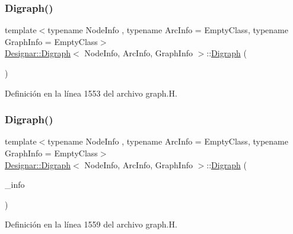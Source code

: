 \subsubsection{\texorpdfstring{Digraph()}{Digraph()}\hspace{0.1cm}{\footnotesize\ttfamily [1/5]}}
{\footnotesize\ttfamily template$<$typename Node\+Info , typename Arc\+Info  = Empty\+Class, typename Graph\+Info  = Empty\+Class$>$ \\
\hyperlink{class_designar_1_1_digraph}{Designar\+::\+Digraph}$<$ Node\+Info, Arc\+Info, Graph\+Info $>$\+::\hyperlink{class_designar_1_1_digraph}{Digraph} (\begin{DoxyParamCaption}{ }\end{DoxyParamCaption})\hspace{0.3cm}{\ttfamily [inline]}}



Definición en la línea 1553 del archivo graph.\+H.

\mbox{\label{class_designar_1_1_digraph_ae5210934b3e6e64caceffee62ff1fcad}} 
\subsubsection{\texorpdfstring{Digraph()}{Digraph()}\hspace{0.1cm}{\footnotesize\ttfamily [2/5]}}
{\footnotesize\ttfamily template$<$typename Node\+Info , typename Arc\+Info  = Empty\+Class, typename Graph\+Info  = Empty\+Class$>$ \\
\hyperlink{class_designar_1_1_digraph}{Designar\+::\+Digraph}$<$ Node\+Info, Arc\+Info, Graph\+Info $>$\+::\hyperlink{class_designar_1_1_digraph}{Digraph} (\begin{DoxyParamCaption}\item[{const Graph\+Info \&}]{\+\_\+info }\end{DoxyParamCaption})\hspace{0.3cm}{\ttfamily [inline]}}



Definición en la línea 1559 del archivo graph.\+H.

\mbox{\label{class_designar_1_1_digraph_a534b12da4e0aeb32cff655f05e6c91a4}} 
